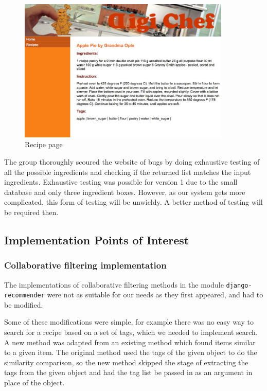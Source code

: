 \begin{figure}
\includegraphics[width=0.9\textwidth]{result_3}
\caption{Recipe page}
\label{fig:result_3}
\end{figure}

The group thoroughly scoured the website of bugs by doing exhaustive testing of all the possible ingredients and checking if the returned list matches the input ingredients. Exhaustive testing was possible for version 1 due to the small database and only three ingredient boxes. However, as our system gets more complicated, this form of testing will be unwieldy. A better method of testing will be required then.


\subsection{Implementation Points of Interest}

\subsubsection{Collaborative filtering implementation}

The implementations of collaborative filtering methods in the module \texttt{django-recommender} were not as suitable for our needs as they first appeared, and had to be modified.

Some of these modifications were simple, for example there was no easy way to search for a recipe based on a set of tags, which we needed to implement search. A new method was adapted from an existing method which found items similar to a given item. The original method used the tags of the given object to do the similarity comparison, so the new method skipped the stage of extracting the tags from the given object and had the tag list be passed in as an argument in place of the object.

